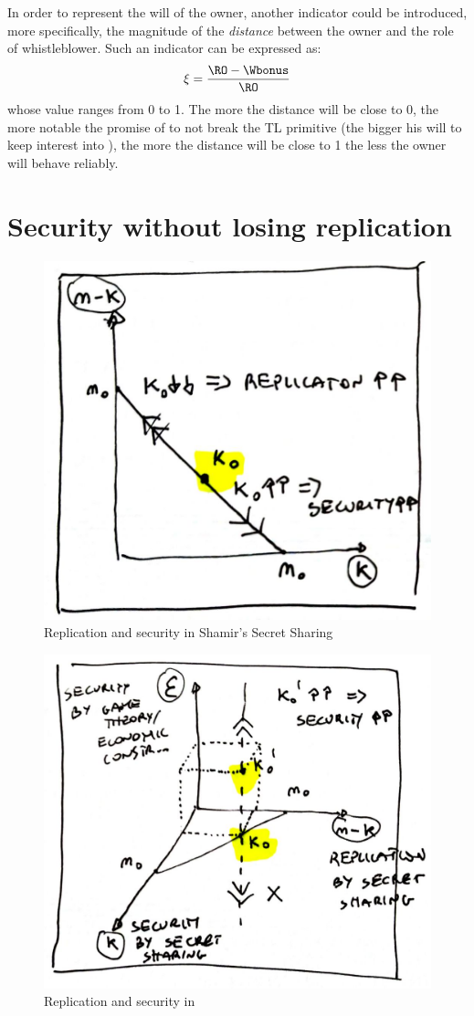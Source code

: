 In order to represent the will of the owner, another indicator could be introduced, more specifically, the magnitude of the {\em distance} between the owner and the role of whistleblower. Such an indicator can be expressed as:
\begin{equation}\label{proprel3}
\xi = \frac{\RO - \Wbonus}{\RO}
\end{equation} 
whose value ranges from 0 to 1. The more the distance will be close to 0, the more notable the promise of \owner to not break the TL primitive (the bigger his will to keep interest into \secret), the more the distance will be close to 1 the less the owner will behave reliably. 


\section{Security without losing replication}

\begin{figure}[t]
	\centering
	\includegraphics[width=.5\textwidth]{fig/rse_a}
	\caption{Replication and security in Shamir's Secret Sharing}
	\label{fig:rsea}
\end{figure}

\begin{figure}[t]
	\centering
	\includegraphics[width=.55\textwidth]{fig/rse_b}
	\caption{Replication and security in \shortname}
	\label{fig:rseb}
\end{figure}


